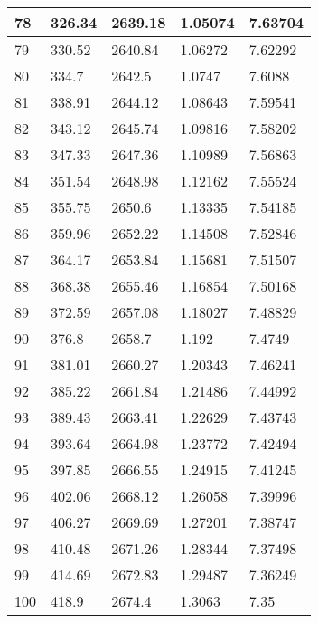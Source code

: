 \documentclass[twocolumn]{article}
\begin{document}
\begin{tabular}{l|l|l|l|l}
78	&	326.34	&	2639.18	&	1.05074	&	7.63704 \\ \hline
79	&	330.52	&	2640.84	&	1.06272	&	7.62292 \\ \hline
80	&	334.7	&	2642.5	&	1.0747	&	7.6088 \\ \hline
81	&	338.91	&	2644.12	&	1.08643	&	7.59541 \\ \hline
82	&	343.12	&	2645.74	&	1.09816	&	7.58202 \\ \hline
83	&	347.33	&	2647.36	&	1.10989	&	7.56863 \\ \hline
84	&	351.54	&	2648.98	&	1.12162	&	7.55524 \\ \hline
85	&	355.75	&	2650.6	&	1.13335	&	7.54185 \\ \hline
86	&	359.96	&	2652.22	&	1.14508	&	7.52846 \\ \hline
87	&	364.17	&	2653.84	&	1.15681	&	7.51507 \\ \hline
88	&	368.38	&	2655.46	&	1.16854	&	7.50168 \\ \hline
89	&	372.59	&	2657.08	&	1.18027	&	7.48829 \\ \hline
90	&	376.8	&	2658.7	&	1.192	&	7.4749 \\ \hline
91	&	381.01	&	2660.27	&	1.20343	&	7.46241 \\ \hline
92	&	385.22	&	2661.84	&	1.21486	&	7.44992 \\ \hline
93	&	389.43	&	2663.41	&	1.22629	&	7.43743 \\ \hline
94	&	393.64	&	2664.98	&	1.23772	&	7.42494 \\ \hline
95	&	397.85	&	2666.55	&	1.24915	&	7.41245 \\ \hline
96	&	402.06	&	2668.12	&	1.26058	&	7.39996 \\ \hline
97	&	406.27	&	2669.69	&	1.27201	&	7.38747 \\ \hline
98	&	410.48	&	2671.26	&	1.28344	&	7.37498 \\ \hline
99	&	414.69	&	2672.83	&	1.29487	&	7.36249 \\ \hline
100	&	418.9	&	2674.4	&	1.3063	&	7.35 \\ \hline
\end{tabular}
\end{document}
